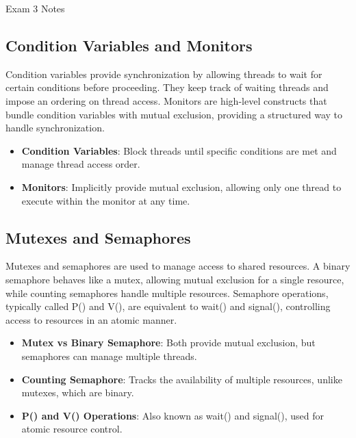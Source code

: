\begin{examnotes}{Exam 3 Notes}
    \subsection*{Condition Variables and Monitors}
    
    Condition variables provide synchronization by allowing threads to wait for certain conditions before proceeding. They keep track of waiting threads and impose an ordering on thread access. Monitors 
    are high-level constructs that bundle condition variables with mutual exclusion, providing a structured way to handle synchronization.
    
    \begin{highlight}
        \begin{itemize}
            \item \textbf{Condition Variables}: Block threads until specific conditions are met and manage thread access order.
            \item \textbf{Monitors}: Implicitly provide mutual exclusion, allowing only one thread to execute within the monitor at any time.
        \end{itemize}
    \end{highlight}
    
    \subsection*{Mutexes and Semaphores}
    
    Mutexes and semaphores are used to manage access to shared resources. A binary semaphore behaves like a mutex, allowing mutual exclusion for a single resource, while counting semaphores handle multiple 
    resources. Semaphore operations, typically called P() and V(), are equivalent to wait() and signal(), controlling access to resources in an atomic manner.
    
    \begin{highlight}
        \begin{itemize}
            \item \textbf{Mutex vs Binary Semaphore}: Both provide mutual exclusion, but semaphores can manage multiple threads.
            \item \textbf{Counting Semaphore}: Tracks the availability of multiple resources, unlike mutexes, which are binary.
            \item \textbf{P() and V() Operations}: Also known as wait() and signal(), used for atomic resource control.
        \end{itemize}
    \end{highlight}
    

\end{examnotes}
